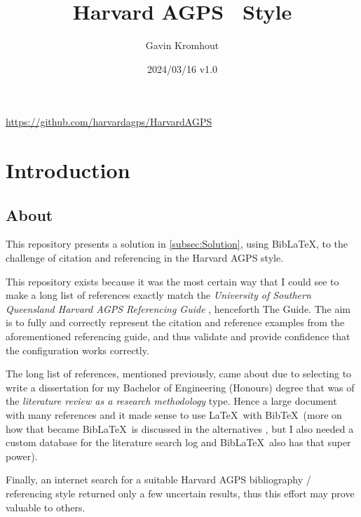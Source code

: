 \documentclass[a4paper, 11pt]{article}
\title{Harvard AGPS \BibLaTeX\ Style}
\author{Gavin Kromhout}
\date{2024/03/16 v1.0}
\newcommand*{\repobaseurl}{https://github.com/harvardagps/HarvardAGPS}
\newcommand*{\BibTeX}{{\sc Bib}\TeX}
\newcommand*{\BibLaTeX}{Bib\LaTeX}
\begin{document}

\maketitle

\begin{center}
    {\color{Magenta} \url{\repobaseurl}}
\end{center}

\tableofcontents

\section{Introduction}

\subsection{About}

This repository presents a solution in \cref{subsec:Solution}, using \BibLaTeX, to the challenge of
citation and referencing in the Harvard AGPS style.

This repository exists because it was the most certain way that I could see to make a long list of
references exactly match the \emph{University of Southern Queensland Harvard AGPS Referencing Guide}
\autocite{UniSQ2020HarvarAGPSRefere}, henceforth The Guide. The aim is to fully and correctly
represent the citation and reference examples from the aforementioned referencing guide, and thus
validate and provide confidence that the configuration works correctly.

The long list of references, mentioned previously, came about due to selecting to write a
dissertation for my Bachelor of Engineering (Honours) degree that was of the \emph{literature review
    as a research methodology} type. Hence a large document with many references and it made sense to
use \LaTeX\ with \BibTeX\ (more on how that became \BibLaTeX\ is discussed in the alternatives
, but I also needed a custom database for the literature search log
and \BibLaTeX\ also has that super power).

Finally, an internet search for a suitable Harvard AGPS bibliography / referencing style returned
only a few uncertain results, thus this effort may prove valuable to others.
\end{document}
